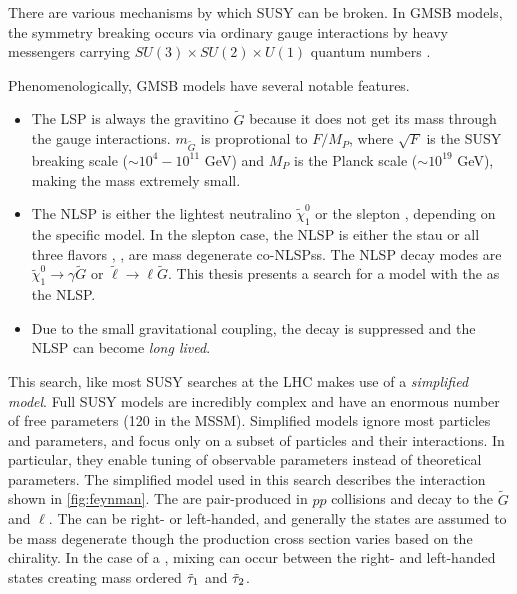 There are various mechanisms by which \ac{SUSY} can be broken. In \acf{GMSB} models, the symmetry breaking occurs via ordinary gauge interactions by heavy messengers carrying $SU(3) \times SU(2) \times U(1)$ quantum numbers \cite{gmsb-lep,Dimopoulos_1996,Ambrosanio_1997}. 



Phenomenologically, \ac{GMSB} models have several notable features. 
\begin{itemize}
	\item The \ac{LSP} is always the gravitino $\tilde{G}$ because it does not get its mass through the gauge interactions. $m_{\tilde{G}}$ is proprotional to $F/M_P$, where $\sqrt{F}$ is the \ac{SUSY} breaking scale ($\sim 10^4 - 10^{11}$ GeV) and $M_P$ is the Planck scale ($\sim 10^{19}$ GeV), making the mass extremely small.

	\item The \ac{NLSP} is either the lightest neutralino $\tilde{\chi}^0_1$ or the slepton \slep, depending on the specific model. In the slepton case, the \ac{NLSP} is either the stau \stau or all three flavors \selec, \smu, \stau are mass degenerate co-\acp{NLSP}s. The \ac{NLSP} decay modes are $\tilde{\chi}^0_1 \rightarrow \gamma \tilde{G}$ or $\tilde{\ell} \rightarrow \ell \tilde{G}$. This thesis presents a search for a model with the \slep as the \ac{NLSP}. 

	\item Due to the small gravitational coupling, the decay is suppressed and the \ac{NLSP} can become \emph{long lived}. 
\end{itemize}

This search, like most \ac{SUSY} searches at the \ac{LHC} makes use of a \emph{simplified model}.
Full \ac{SUSY} models are incredibly complex and have an enormous number of free parameters (120 in the \ac{MSSM}). Simplified models ignore most particles and parameters, and focus only on a subset of particles and their interactions. In particular, they enable tuning of observable parameters instead of theoretical parameters. The simplified model used in this search describes the interaction shown in \autoref{fig:feynman}. The \slep are pair-produced in $pp$ collisions and decay to the $\tilde{G}$ and $\ell$. The \slep can be right- or left-handed, and generally the states are assumed to be mass degenerate though the production cross section varies based on the chirality. In the case of a \stau, mixing can occur between the right- and left-handed states creating mass ordered $\tilde{\tau}_1$ and $\tilde{\tau}_2$.

